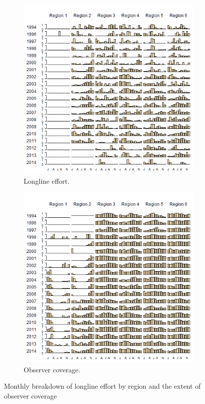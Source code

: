 \documentclass[12pt]{SCreport}
\begin{document}
\begin{landscape}
\begin{figure}
\centering
   \begin{subfigure}[b]{0.6\textwidth}
       \includegraphics[width=\textwidth]{../GRAPHICS/Defined/FIG_06a_obsBY_mm_RDS}
       \caption{Longline effort.}
       \label{fig:test1}
   \end{subfigure}
   \begin{subfigure}[b]{0.6\textwidth}
       \includegraphics[width=\textwidth]{../GRAPHICS/Defined/FIG_06b_LOGSHEET_mm_RDS}
       \caption{Observer coverage.}
       \label{fig:test2}
   \end{subfigure}
\caption{Monthly breakdown of longline effort by region and the extent of observer coverage}
\label{fig:fig06} 
\end{figure}
\end{landscape}
\end{document}
